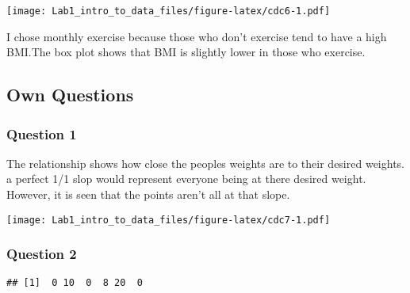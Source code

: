 \documentclass[]{article}
\newenvironment{Shaded}{\begin{snugshade}}{\end{snugshade}}
\newcommand{\DataTypeTok}[1]{\textcolor[rgb]{0.13,0.29,0.53}{#1}}
\newcommand{\KeywordTok}[1]{\textcolor[rgb]{0.13,0.29,0.53}{\textbf{#1}}}
\newcommand{\NormalTok}[1]{#1}
\newcommand{\OperatorTok}[1]{\textcolor[rgb]{0.81,0.36,0.00}{\textbf{#1}}}
\newcommand{\StringTok}[1]{\textcolor[rgb]{0.31,0.60,0.02}{#1}}
\begin{document}
\texttt{[image: Lab1\_intro\_to\_data\_files/figure-latex/cdc6-1.pdf]}

I chose monthly exercise because those who don't exercise tend to have a
high BMI.The box plot shows that BMI is slightly lower in those who
exercise.

\hypertarget{own-questions}{%
\subsection{Own Questions}\label{own-questions}}

\hypertarget{question-1-1}{%
\subsubsection{Question 1}\label{question-1-1}}

The relationship shows how close the peoples weights are to their
desired weights. a perfect 1/1 slop would represent everyone being at
there desired weight. However, it is seen that the points aren't all at
that slope.

\begin{Shaded}
\end{Shaded}

\texttt{[image: Lab1\_intro\_to\_data\_files/figure-latex/cdc7-1.pdf]}

\hypertarget{question-2-1}{%
\subsubsection{Question 2}\label{question-2-1}}

\begin{Shaded}
\end{Shaded}

\begin{verbatim}
## [1]  0 10  0  8 20  0
\end{verbatim}
\end{document}
